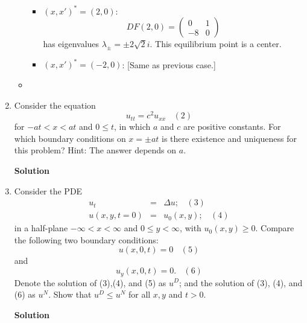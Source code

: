 \documentclass{article}
\begin{document}
\begin{enumerate}
\begin{itemize}
\begin{itemize}
\item \((x,x')^* = (2,0)\):
\[DF(2,0) = \left( \begin{array}{cc} 0 & 1 \\ -8 & 0 \end{array} \right)\]
has eigenvalues \(\lambda_{\pm} = \pm 2 \sqrt{2} i\).  This equilibrium point is a center.

\item \((x,x')^* = (-2,0)\):  [Same as previous case.]

\end{itemize}

\item

\end{itemize}



\item Consider the equation
\[u_{tt} = c^2 u_{xx} \ \ \ \ (2)\]
for \(-a t < x < a t\) and \(0 \leq t\), in which \(a\) and \(c\) are positive constants.  For which boundary conditions on \(x = \pm a t\) is there existence and uniqueness for this problem?  Hint:  The answer depends on \(a\).

{\bf Solution}





\item Consider the PDE
\begin{eqnarray*}
u_t & = & \Delta u; \ \ \ \ (3) \\
u(x,y,t = 0) & = & u_0(x,y); \ \ \ \ (4)
\end{eqnarray*}
in a half-plane \(-\infty < x < \infty\) and \(0 \leq y < \infty\), with \(u_0(x,y) \geq 0\).  Compare the following two boundary conditions:
\[u(x,0,t) = 0 \ \ \ \ (5)\]
and
\[u_y(x,0,t) = 0. \ \ \ \ (6)\]
Denote the solution of (3),(4), and (5) as \(u^D\); and the solution of (3), (4), and (6) as \(u^N\).  Show that \(u^D \leq u^N\) for all \(x,y\) and \(t > 0\).

{\bf Solution}


\end{enumerate}
\end{document}
